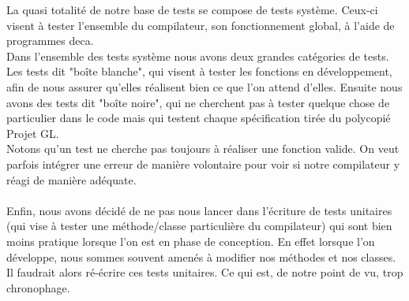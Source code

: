 \documentclass{article}
\begin{document}
La quasi totalité de notre base de tests se compose de tests système. Ceux-ci visent à tester l'ensemble du compilateur,
son fonctionnement global, à l’aide de programmes deca. \\
Dans l'ensemble des tests système nous avons deux grandes catégories de tests.
Les tests dit "boîte blanche", qui visent à tester les fonctions en développement, afin de nous assurer qu'elles réalisent bien
ce que l'on attend d'elles. Ensuite nous avons des tests dit "boîte noire", qui ne cherchent pas à tester quelque chose de particulier
dans le code mais qui testent chaque spécification tirée du polycopié Projet GL. \\
Notons qu'un test ne cherche pas toujours à réaliser une fonction valide. On veut parfois intégrer une erreur de manière volontaire pour voir
si notre compilateur y réagi de manière adéquate.
\\
\\
Enfin, nous avons décidé de ne pas nous lancer dans l’écriture de tests unitaires (qui vise à tester une méthode/classe particulière
du compilateur) qui sont bien moins pratique lorsque l'on est en phase
de conception. En effet lorsque l'on développe, nous sommes souvent amenés à modifier nos méthodes et nos classes. Il faudrait alors
ré-écrire ces tests unitaires. Ce qui est, de notre point de vu, trop chronophage.
\end{document}
